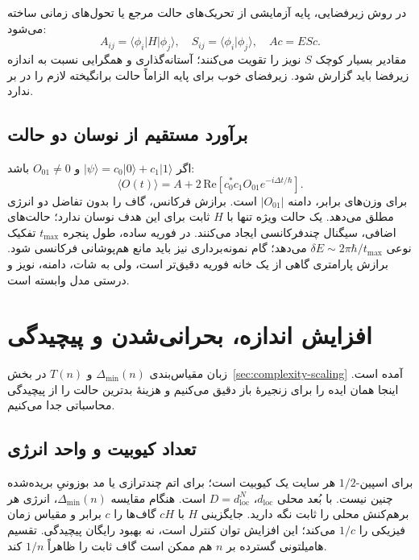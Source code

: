 در روش زیرفضایی، پایه آزمایشی از تحریک‌های حالت مرجع یا تحول‌های زمانی ساخته می‌شود:
\begin{equation}
	A_{ij}=\langle\phi_i|H|\phi_j\rangle,\quad
	S_{ij}=\langle\phi_i|\phi_j\rangle,\quad Ac=ESc.
\end{equation}
مقادیر بسیار کوچک $S$ نویز را تقویت می‌کنند؛ آستانه‌گذاری و همگرایی نسبت به اندازه زیرفضا باید گزارش شود.
زیرفضای خوب برای پایه الزاماً حالت برانگیخته لازم را در بر ندارد.

\subsection{برآورد مستقیم از نوسان دو حالت}
اگر $|\psi\rangle=c_0|0\rangle+c_1|1\rangle$ و $O_{01}\ne0$ باشد:
\begin{equation}
	\langle O(t)\rangle=A+
	2\,\mathrm{Re}[c_0^*c_1O_{01}e^{-i\Delta t/\hbar}].
	\label{eq:gap-oscillation}
\end{equation}
برای وزن‌های برابر، دامنه $|O_{01}|$ است. برازش فرکانس، گاف را بدون تفاضل دو انرژی مطلق می‌دهد.
یک حالت ویژه تنها با $H$ ثابت برای این هدف نوسان ندارد؛ حالت‌های اضافی، سیگنال چندفرکانسی ایجاد می‌کنند.
در فوریه ساده، طول پنجره $t_{\max}$ تفکیک نوعی
$\delta E\sim2\pi\hbar/t_{\max}$ می‌دهد؛ گام نمونه‌برداری نیز باید مانع هم‌پوشانی فرکانسی شود.
برازش پارامتری گاهی از یک خانه فوریه دقیق‌تر است، ولی به شات، دامنه، نویز و درستی مدل وابسته است.

\section{افزایش اندازه، بحرانی‌شدن و پیچیدگی}
\label{sec:gap-scaling}
زبان مقیاس‌بندی $\Delta_{\min}(n)$ و $T(n)$ در بخش~\ref{sec:complexity-scaling} آمده است.
اینجا همان ایده را برای زنجیرهٔ باز  دقیق می‌کنیم و هزینهٔ بدترین حالت را از پیچیدگی محاسباتی جدا می‌کنیم.

\subsection{تعداد کیوبیت و واحد انرژی}
برای اسپین-$1/2$ هر سایت یک کیوبیت است؛ برای اتم چندترازی یا مد بوزونیِ بریده‌شده چنین نیست.
با بُعد محلی $d_{\mathrm{loc}}$، $D=d_{\mathrm{loc}}^N$ است.
هنگام مقایسه $\Delta_{\min}(n)$، انرژی هر برهم‌کنش محلی را ثابت نگه دارید.
جایگزینی $H$ با $cH$ گاف‌ها را $c$ برابر و مقیاس زمان فیزیکی را $1/c$ می‌کند؛ این افزایش توان کنترل است، نه بهبود رایگان پیچیدگی.
تقسیم هامیلتونی گسترده بر $n$ هم ممکن است گاف ثابت را ظاهراً $1/n$ کند.

